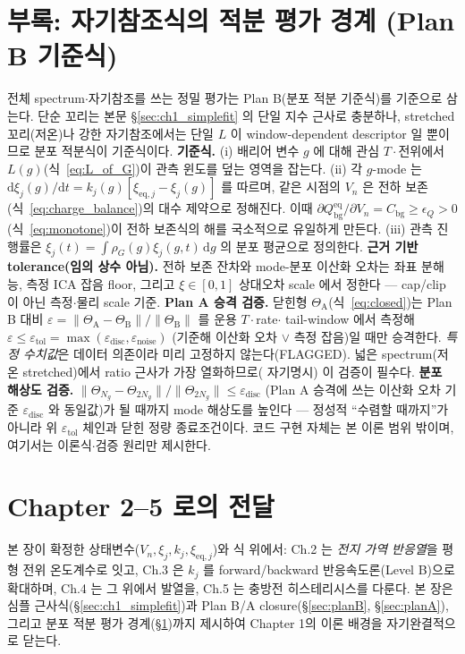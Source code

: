 \documentclass[11pt,a4paper]{article}
\newcommand{\dd}{\mathrm{d}}
\newcommand{\eq}{\mathrm{eq}}
\newcommand{\bg}{\mathrm{bg}}
\begin{document}
\section{부록: 자기참조식의 적분 평가 경계 (Plan B 기준식)}\label{sec:ch1_numeric}
전체 spectrum$\cdot$자기참조를 쓰는 정밀 평가는 Plan B(분포 적분 기준식)를 기준으로 삼는다. 단순 꼬리는 본문
\S\ref{sec:ch1_simplefit} 의 단일 지수 근사로 충분하나, stretched 꼬리(저온)나 강한 자기참조에서는 단일 $L$ 이
window-dependent descriptor 일 뿐이므로 분포 적분식이 기준식이다.
\textbf{기준식.} (i) 배리어 변수 $g$ 에 대해 관심 $T\cdot$전위에서 $L(g)$(식~\eqref{eq:L_of_G})이
관측 윈도를 덮는 영역을 잡는다. (ii) 각 $g$-mode 는
$\dd\xi_j(g)/\dd t=k_j(g)[\xi_{\eq,j}-\xi_j(g)]$ 를 따르며, 같은 시점의 $V_n$ 은 전하 보존
(식~\eqref{eq:charge_balance})의 대수 제약으로 정해진다. 이때
$\partial Q_\bg^{\eq}/\partial V_n=C_\bg\ge\epsilon_Q>0$(식~\eqref{eq:monotone})이 전하 보존식의 해를 국소적으로
유일하게 만든다. (iii) 관측 진행률은 $\xi_j(t)=\int \rho_G(g)\xi_j(g,t)\,\dd g$ 의 분포 평균으로 정의한다.
\textbf{근거 기반 tolerance(임의 상수 아님).} 전하 보존 잔차와 mode-분포 이산화 오차는 좌표 분해능, 측정 ICA
잡음 floor, 그리고 $\xi\in[0,1]$ 상대오차 scale 에서 정한다 — cap/clip 이 아닌 측정$\cdot$물리 scale 기준.
\textbf{Plan A 승격 검증.} 닫힌형 $\Theta_\mathrm A$(식~\eqref{eq:closed})는 Plan B 대비
$\varepsilon=\lVert\Theta_\mathrm A-\Theta_\mathrm B\rVert/\lVert\Theta_\mathrm B\rVert$ 를 운용 $T\cdot$rate$\cdot$
tail-window 에서 측정해 $\varepsilon\le\varepsilon_{\mathrm{tol}}=\max(\varepsilon_{\mathrm{disc}},\varepsilon_{\mathrm{noise}})$
(기준해 이산화 오차 $\vee$ 측정 잡음)일 때만 승격한다. \emph{특정 수치값}은 데이터 의존이라 미리 고정하지 않는다(FLAGGED). 넓은
spectrum(저온 stretched)에서 ratio 근사가 가장 열화하므로(\cite{jcp2017} 자기명시) 이 검증이 필수다.
\textbf{분포 해상도 검증.} $\lVert\Theta_{N_g}-\Theta_{2N_g}\rVert/\lVert\Theta_{2N_g}\rVert\le\varepsilon_{\mathrm{disc}}$
(Plan A 승격에 쓰는 이산화 오차 기준 $\varepsilon_{\mathrm{disc}}$ 와 동일값)가 될 때까지 mode 해상도를 높인다 —
정성적 ``수렴할 때까지''가 아니라 위 $\varepsilon_{\mathrm{tol}}$ 체인과 닫힌 정량 종료조건이다. 코드 구현 자체는
본 이론 범위 밖이며, 여기서는 이론식$\cdot$검증 원리만 제시한다.

\section*{Chapter 2--5 로의 전달}
본 장이 확정한 상태변수($V_n,\xi_j,k_j,\xi_{\eq,j}$)와 식 위에서: Ch.2 는 \emph{전지 가역 반응열}을 평형
전위 온도계수로 잇고, Ch.3 은 $k_j$ 를 forward/backward 반응속도론(Level B)으로 확대하며, Ch.4 는 그 위에서
발열을, Ch.5 는 충방전 히스테리시스를 다룬다. 본 장은 심플 근사식(\S\ref{sec:ch1_simplefit})과
Plan B/A closure(\S\ref{sec:planB}, \S\ref{sec:planA}), 그리고 분포 적분 평가 경계(\S\ref{sec:ch1_numeric})까지
제시하여 Chapter 1의 이론 배경을 자기완결적으로 닫는다.
\end{document}
